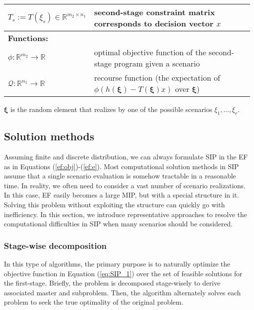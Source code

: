 \begin{table}[]
{\begin{threeparttable}
\begin{tabular}{ll}
				$T_s:= T(\xi_s)\in\mathbb{R}^{m_2\times n_1}$	& second-stage constraint matrix corresponds to decision vector $x$\\ \midrule
				\multicolumn{2}{l}{\textbf{Functions:}} \\
				$\phi:\mathbb{R}^{m_2}\to\mathbb{R}$	&  optimal objective function of the second-stage program given a scenario\\
				$\mathcal{Q}:\mathbb{R}^{n_1}\to\mathbb{R}$	& recourse function (the expectation of $\phi\left( h(\pmb{\xi})-T(\pmb{\xi})x \right)$ over $\pmb{\xi}$) 	\\
				\bottomrule
			\end{tabular}
			\begin{tablenotes}
			\small
			\item $\pmb{\xi}$ is the random element that realizes by one of the possible scenarios $\xi_1,\ldots,\xi_r$.		
			\end{tablenotes}
		\end{threeparttable}
	}
\end{table} 


\subsection{Solution methods}
Assuming finite and discrete distribution, we can always formulate SIP in the EF as in Equations (\ref{ef:obj})-(\ref{ef:e}).  %
Most computational solution methods in SIP assume that a single scenario evaluation is somehow tractable in a reasonable time. In reality, we often need to consider a vast number of scenario realizations. In this case, EF easily becomes a large MIP, but with a special structure in it. Solving this problem without exploiting the structure can quickly go with inefficiency. In this section, we introduce representative approaches to resolve the computational difficulties in SIP when many scenarios should be considered.

\subsubsection{Stage-wise decomposition}
In this type of algorithms, the primary purpose is to naturally optimize the objective function in Equation (\ref{eq:SIP_1}) over the set of feasible solutions for the first-stage. Briefly, the problem is decomposed stage-wisely to derive associated master and subproblem. Then, the algorithm alternately solves each problem to seek the true optimality of the original problem.
 
